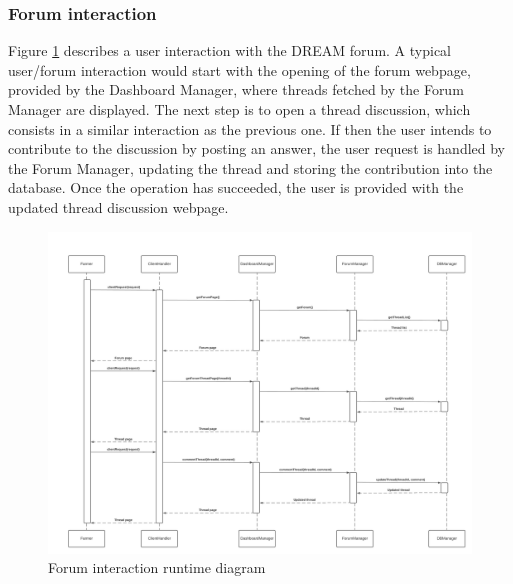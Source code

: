 \documentclass[10pt]{article} %
\begin{document}
\subsubsection{Forum interaction}
Figure \ref{fig:r_forum} describes a user interaction with the DREAM forum. A typical user/forum interaction would start with the opening of the forum webpage, provided by the Dashboard Manager,
where threads fetched by the Forum Manager are displayed. The next step is to open a thread discussion, which consists in a similar interaction as the previous one. If then the user intends to contribute
to the discussion by posting an answer, the user request is handled by the Forum Manager, updating the thread and storing the contribution into the database. Once the operation has succeeded, the user
is provided with the updated thread discussion webpage.
\begin{figure}[h!]
    \centering
    \centerline{\includegraphics[scale=0.4]{images/rv/answerForum.png}}
    \caption{Forum interaction runtime diagram}
    \label{fig:r_forum}
\end{figure}
\end{document}
